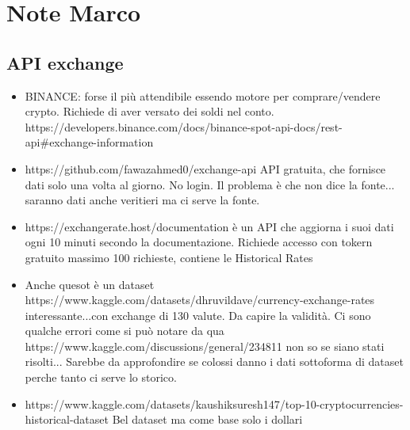 \documentclass[12pt, letterpaper]{article}
\begin{document}
	

	
	
	
	

	\section{Note Marco}
	\subsection{API exchange}
	\begin{itemize}
		\item BINANCE: forse il più attendibile essendo motore per comprare/vendere crypto. Richiede di aver versato dei soldi nel conto.
		https://developers.binance.com/docs/binance-spot-api-docs/rest-api#exchange-information
		\item https://github.com/fawazahmed0/exchange-api API gratuita, che fornisce dati solo una volta al giorno. No login. Il problema è che non dice la fonte...
		saranno dati anche veritieri ma ci serve la fonte.
		\item https://exchangerate.host/documentation è un API che aggiorna i suoi dati ogni 10 minuti secondo la documentazione. Richiede accesso con tokern gratuito massimo
		100 richieste, contiene le Historical Rates 
		\item Anche quesot è un dataset https://www.kaggle.com/datasets/dhruvildave/currency-exchange-rates interessante...con exchange di 130 valute. Da capire la validità. Ci sono qualche errori come si può notare da qua https://www.kaggle.com/discussions/general/234811 non so se siano stati risolti...
		Sarebbe da approfondire se colossi danno i dati sottoforma di dataset perche tanto ci serve lo storico. 
		\item https://www.kaggle.com/datasets/kaushiksuresh147/top-10-cryptocurrencies-historical-dataset Bel dataset ma come base solo i dollari
	\end{itemize}
	
	
\end{document}

